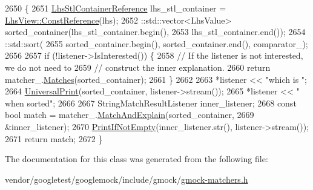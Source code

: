 \begin{DoxyCode}
2650                                                                       \{
2651       \hyperlink{classtesting_1_1internal_1_1WhenSortedByMatcher_1_1Impl_ab5e53a762bb213ccf84299b31c825b58}{LhsStlContainerReference} lhs\_stl\_container = 
      \hyperlink{classtesting_1_1internal_1_1StlContainerView_a36eccf53329730f6e55c12002128bf25}{LhsView::ConstReference}(lhs);
2652       ::std::vector<LhsValue> sorted\_container(lhs\_stl\_container.begin(),
2653                                                lhs\_stl\_container.end());
2654       ::std::sort(
2655            sorted\_container.begin(), sorted\_container.end(), comparator\_);
2656 
2657       \textcolor{keywordflow}{if} (!listener->IsInterested()) \{
2658         \textcolor{comment}{// If the listener is not interested, we do not need to}
2659         \textcolor{comment}{// construct the inner explanation.}
2660         \textcolor{keywordflow}{return} matcher\_.\hyperlink{classtesting_1_1internal_1_1MatcherBase_a105a9dae7afecee8898db8ad1887b0db}{Matches}(sorted\_container);
2661       \}
2662 
2663       *listener << \textcolor{stringliteral}{"which is "};
2664       \hyperlink{namespacetesting_1_1internal_ad121a890bddf866e59605d1a0198dada}{UniversalPrint}(sorted\_container, listener->stream());
2665       *listener << \textcolor{stringliteral}{" when sorted"};
2666 
2667       StringMatchResultListener inner\_listener;
2668       \textcolor{keyword}{const} \textcolor{keywordtype}{bool} match = matcher\_.\hyperlink{classtesting_1_1internal_1_1MatcherBase_ae3f5f3150a95cafb1c2ab7c864a42e65}{MatchAndExplain}(sorted\_container,
2669                                                   &inner\_listener);
2670       \hyperlink{namespacetesting_1_1internal_a77c9e2b66d2b2414db4763971180d53c}{PrintIfNotEmpty}(inner\_listener.str(), listener->stream());
2671       \textcolor{keywordflow}{return} match;
2672     \}
\end{DoxyCode}


The documentation for this class was generated from the following file\+:\begin{DoxyCompactItemize}
\item 
vendor/googletest/googlemock/include/gmock/\hyperlink{gmock-matchers_8h}{gmock-\/matchers.\+h}\end{DoxyCompactItemize}
